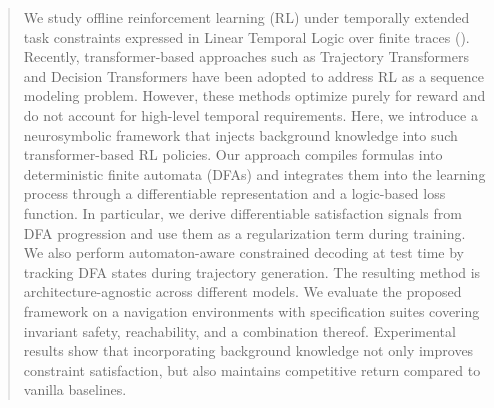\documentclass[runningheads]{llncs}
\begin{document}
\begin{abstract}
We study offline reinforcement learning (RL) under temporally extended task constraints expressed in Linear Temporal Logic over finite traces (\ltlf). Recently, transformer-based approaches such as Trajectory Transformers and Decision Transformers have been adopted to address RL as a sequence modeling problem.
However, these methods optimize purely for reward and do not account for high-level temporal requirements.
%
Here, we introduce a neurosymbolic framework that injects \ltlf background knowledge into such transformer-based RL policies. 
Our approach compiles \ltlf formulas into deterministic finite automata (DFAs) and integrates them into the learning process through a differentiable representation and a logic-based loss function.
In particular, we derive differentiable satisfaction signals from DFA progression and use them as a regularization term during training. We also perform automaton-aware constrained decoding at test time by tracking DFA states during trajectory generation. The resulting method is architecture-agnostic across different models.
%
We evaluate the proposed framework on a navigation environments with specification suites covering invariant safety, reachability, and a combination thereof. Experimental results show that incorporating background knowledge not only improves constraint satisfaction, but also maintains competitive return compared to vanilla baselines.

%
\end{abstract}
%
%
%
\end{document}
